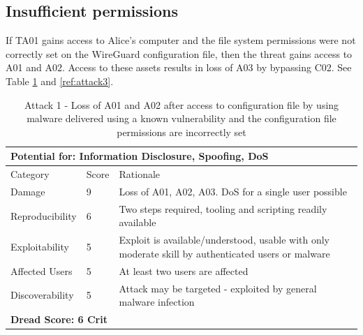 \documentclass [11pt, proquest] {uwthesis}[2020/02/24]
\begin{document}
\subsection{Insufficient permissions}
If TA01 gains access to Alice's computer and the file system permissions were not correctly set on the WireGuard configuration file, then the threat gains access to A01 and A02. Access to these assets results in loss of A03 by bypassing C02. 
See Table \ref{ref:attack1} and \ref{ref:attack3}.
\begin{table}[H]
\begin{tabular}{|m{3cm}|m{1cm}|p{27em} |}
\multicolumn{3}{l}{Potential for: Information Disclosure, Spoofing, DoS}                   \\
\hline
Category & Score & Rationale     \\
\hline
Damage          & 9     & Loss of A01, A02, A03. DoS for a single user possible            \\
\hline
Reproducibility & 6     & Two steps required, tooling and scripting readily available    \\
\hline
Exploitability & 5      & Exploit is available/understood, usable with only moderate skill by authenticated users or malware \\
\hline
Affected Users  & 5     & At least two users are affected                     \\
\hline
Discoverability & 5     & Attack may be targeted - exploited by general malware infection \\
\hline
\multicolumn{3}{l}{\textbf{Dread Score: 6 Crit}} 
\end{tabular}
\caption{Attack 1 - Loss of A01 and A02 after access to configuration file by using malware delivered using a known vulnerability and the configuration file permissions are incorrectly set}
\label{ref:attack1}
\end{table}
\end{document}

